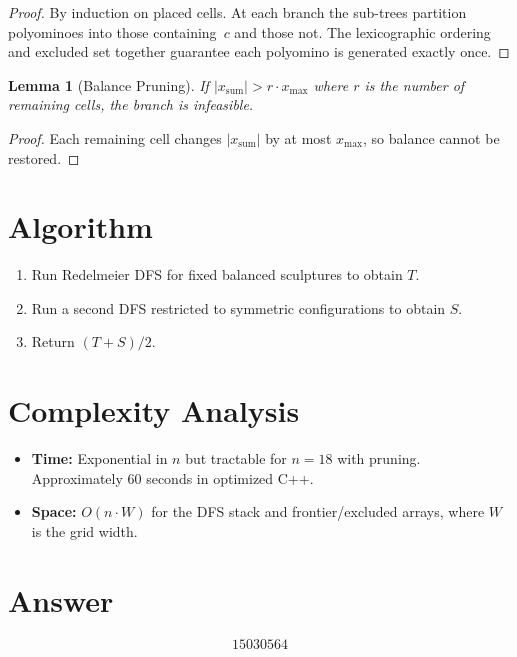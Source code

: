 \documentclass[12pt]{article}
\newtheorem{lemma}[theorem]{Lemma}
\begin{document}
\begin{proof}
By induction on placed cells. At each branch the sub-trees partition polyominoes into those containing~$c$ and those not. The lexicographic ordering and excluded set together guarantee each polyomino is generated exactly once.
\end{proof}

\begin{lemma}[Balance Pruning]
If $|x_{\mathrm{sum}}| > r \cdot x_{\max}$ where $r$ is the number of remaining cells, the branch is infeasible.
\end{lemma}

\begin{proof}
Each remaining cell changes $|x_{\mathrm{sum}}|$ by at most $x_{\max}$, so balance cannot be restored.
\end{proof}

\section{Algorithm}
\begin{enumerate}
    \item Run Redelmeier DFS for fixed balanced sculptures to obtain $T$.
    \item Run a second DFS restricted to symmetric configurations to obtain $S$.
    \item Return $(T + S)/2$.
\end{enumerate}

\section{Complexity Analysis}
\begin{itemize}
    \item \textbf{Time:} Exponential in $n$ but tractable for $n = 18$ with pruning. Approximately 60 seconds in optimized C++.
    \item \textbf{Space:} $O(n \cdot W)$ for the DFS stack and frontier/excluded arrays, where $W$ is the grid width.
\end{itemize}

\section{Answer}

\[
\boxed{15030564}
\]
\end{document}
